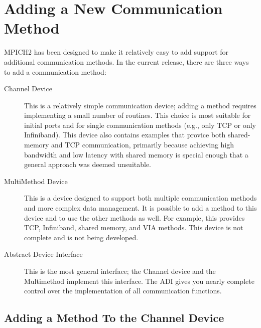\documentclass{article}
\begin{document}
\section{Adding a New Communication Method}
\label{sec:adding-methods}
MPICH2 has been designed to make it relatively easy to add support for
additional communication methods.  In the current release, there are three
ways to add a communication method:
\begin{description}
\item[Channel Device]This is a relatively simple communication device; adding
  a method requires implementing a small number of routines.  This choice is
  most suitable for initial ports and for single communication methods (e.g.,
  only TCP or only Infiniband).  This device also contains examples
  that provice both shared-memory and TCP communication, primarily
  because achieving high bandwidth and low latency with shared memory
  is special enough that a general approach was deemed unsuitable.

\item[MultiMethod Device]This is a device designed to support both multiple
  communication methods and more complex data management.  It is possible to
  add a method to this device and to use the other methods as well.  For
  example, this provides TCP, Infiniband, shared memory, and VIA methods.
  This device is not complete and is not being developed.

\item[Abstract Device Interface]This is the most general interface; the
  Channel device and the Multimethod implement this interface.  The ADI gives
  you nearly complete control over the implementation of all communication
  functions.
\end{description}

\subsection{Adding a Method To the Channel Device}
\label{sec:adding-channel}
\end{document}
